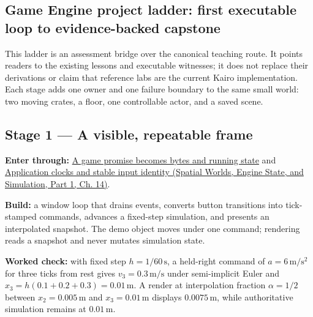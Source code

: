 \subsection{Game Engine project ladder: first executable loop to evidence-backed capstone}\label{06-engine-ii-ch042-game-engine-project-ladder-first-executable-loop-to-evidence-backed-capstone}

\hypertarget{06-engine-ii-ch042-game-engine-project-ladder-first-executable-loop-to-evidence-backed-capstone}{}

This ladder is an assessment bridge over the canonical teaching route. It points readers to the existing lessons and executable witnesses; it does not replace their derivations or claim that reference labs are the current Kairo implementation. Each stage adds one owner and one failure boundary to the same small world: two moving crates, a floor, one controllable actor, and a saved scene.

\subsection{Stage 1 --- A visible, repeatable frame}\label{06-engine-ii-ch042-stage-1-a-visible-repeatable-frame}

\hypertarget{06-engine-ii-ch042-stage-1-a-visible-repeatable-frame}{}

\textbf{Enter through:} \hyperref[05-engine-i-ch002-where-the-bytes-live]{A game promise becomes bytes and running state} and \href{../05-Spatial-Worlds-Engine-State-and-Simulation-P01/main.pdf\#nameddest=05-engine-i-ch014-keep-application-key-names-independent-of-a-windowing-library}{Application clocks and stable input identity (Spatial Worlds, Engine State, and Simulation, Part 1, Ch. 14)}.

\textbf{Build:} a window loop that drains events, converts button transitions into tick-stamped commands, advances a fixed-step simulation, and presents an interpolated snapshot. The demo object moves under one command; rendering reads a snapshot and never mutates simulation state.

\textbf{Worked check:} with fixed step \(h=1/60\,\mathrm s\), a held-right command of \(a=6\,\mathrm{m/s^2}\) for three ticks from rest gives \(v_3=0.3\,\mathrm{m/s}\) under semi-implicit Euler and \(x_3=h(0.1+0.2+0.3)=0.01\,\mathrm m\). A render at interpolation fraction \(\alpha=1/2\) between \(x_2=0.005\,\mathrm m\) and \(x_3=0.01\,\mathrm m\) displays \(0.0075\,\mathrm m\), while authoritative simulation remains at \(0.01\,\mathrm m\).

